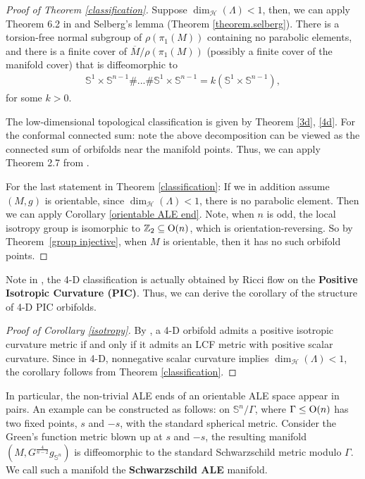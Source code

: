 \documentclass[12pt]{amsart}
\theoremstyle{definition}
\begin{document}
\begin{proof}[Proof of Theorem \ref{classification}]
    Suppose $\dim_{\mathcal{H}}(\Lambda)<1$, then, we can apply Theorem 6.2 in \cite{Ilimit} and Selberg's lemma (Theorem \ref{theorem.selberg}). There is a torsion-free normal subgroup of $\rho(\pi_1(M))$ containing no parabolic elements, and there is a finite cover of $\overline{M}/\rho(\pi_1(M))$ (possibly a finite cover of the manifold cover) that is diffeomorphic to
    \begin{align*}
    \mathbb{S}^1\times \mathbb{S}^{n-1}\# ...\# \mathbb{S}^1\times \mathbb{S}^{n-1} = k(\mathbb{S}^1\times \mathbb{S}^{n-1}),
    \end{align*}
    for some $k>0$.

    The low-dimensional topological classification is given by Theorem \ref{3d}, \ref{4d}.
    For the conformal connected sum: note the above decomposition can be viewed as the connected sum of orbifolds near the manifold points. Thus, we can apply Theorem 2.7 from \cite{Idecomposition}.
    
    For the last statement in Theorem \ref{classification}: If we in addition assume $(M,g)$ is orientable, since $\dim_{\mathcal{H}}(\Lambda)<1$, there is no parabolic element. Then we can apply Corollary \ref{orientable ALE end}. Note, when $n$ is odd, the local isotropy group is isomorphic to $\mathbb{Z}_2\subseteq {\rm{O}}(n)$, which is orientation-reversing. So by Theorem~\ref{group injective}, when $M$ is orientable, then it has no such orbifold points.  
\end{proof}

Note in \cite{Ilimit}, the 4-D classification is actually obtained by Ricci flow on the \textbf{Positive Isotropic Curvature (PIC)}. Thus, we can derive the corollary of the structure of 4-D PIC orbifolds.

\begin{proof}[Proof of Corollary \ref{isotropy}]
By \cite{ChenZhu}, a 4-D orbifold admits a positive isotropic curvature metric if and only if it admits an LCF metric with positive scalar curvature. Since in 4-D, nonnegative scalar curvature implies $\dim_{\mathcal{H}}(\Lambda)<1$, the corollary follows from Theorem \ref{classification}.
\end{proof}

In particular, the non-trivial ALE ends of an orientable ALE space appear in pairs. 
An example can be constructed as follows: on $\mathbb{S}^n/\Gamma$, where $\Gamma\leq {\rm{O}}(n)$ has two fixed points, $s$ and $-s$, with the standard spherical metric. Consider the Green's function metric blown up at $s$ and $-s$, the resulting manifold $(M, G^{\frac{4}{n-2}}g_{\mathbb{S}^n})$ is diffeomorphic to the standard Schwarzschild metric modulo $\Gamma$. We call such a manifold the \textbf{Schwarzschild ALE} manifold. 
\end{document}
